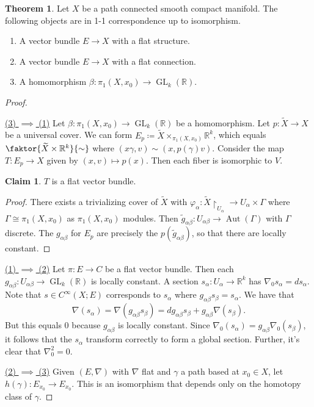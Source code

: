 \documentclass[10pt,letterpaper,cm]{nupset}
\theoremstyle{definition}
\theoremstyle{theorem}
\newtheorem{theorem}[definition]{Theorem}
\newtheorem*{claim}{Claim}
\theoremstyle{remark}
\newcommand{\R}{\mathbb{R}}
\newcommand{\1}{\mathbb{1}}
\newcommand{\0}{\vec 0}
\DeclareMathOperator{\GL}{GL}
\DeclareMathOperator{\aut}{Aut}
\begin{document}
\begin{theorem}
Let $X$ be a path connected smooth compact manifold. The following objects are in 1-1 correspondence up to isomorphism.
\begin{enumerate}[label=(\arabic*)]
\item A vector bundle $E \to X$ with a flat structure.
\item A vector bundle $E \to X$ with a flat connection.
\item A homomorphism $\beta : \pi_1\left(X, x_0\right) \to \GL_k(\R)$.
\end{enumerate}
\end{theorem}
\begin{proof} $ $
\smallskip

\underline{(3) $\implies$ (1)} Let $\beta : \pi_1\left(X, x_0\right) \to \GL_k(\R)$ be a homomorphism. Let $p : \widetilde{X} \to X$ be a universal cover. We can form $E_p \coloneqq  \widetilde{X} \times_{\pi_1\left(X, x_0\right)} \R^k$, which equals $\faktor{\widetilde{X} \times \R^k}{\sim}$ where $(x{\gamma}, v) \sim (x, p(\gamma)v)$.  Consider the map $T: E_p \to X$ given by $(x,v) \mapsto p(x)$. Then each fiber is isomorphic to $V$.
\begin{claim}
$T$ is a flat vector bundle.
\end{claim}
\begin{proof}
There exists a trivializing cover of $\widetilde{X}$ with $\varphi_{\alpha} : \widetilde{X}\restriction_{U_{\alpha}} \to U_{\alpha} \times \Gamma$ where $\Gamma \cong \pi_1\left(X, x_0\right)$ as $\pi_1\left(X, x_0\right)$ modules. Then $\tilde{g}_{\alpha{\beta}} : U_{\alpha{\beta}} \to \aut(\Gamma)$ with $\Gamma$ discrete. The $g_{\alpha{\beta}}$ for $E_p$ are precisely the $p(\tilde{g}_{\alpha{\beta}})$, so that there are locally constant. 
\end{proof}
\underline{(1) $\implies$ (2)} Let $\pi : E \to C$ be a flat vector bundle. Then each $g_{\alpha{\beta}} : U_{\alpha{\beta}} \to \GL_k(\R)$  is locally constant. A section  $s_{\alpha} : U_{\alpha} \to \R^k$ has $\nabla_0{s_{\alpha}} = ds_{\alpha}$. Note that $s \in C^{\infty}(X; E)$ corresponds to $s_{\alpha}$ where $g_{\alpha{\beta}}s_{\beta} = s_{\alpha}$. We have that $$ \nabla(s_{\alpha}) = \nabla(g_{\alpha{\beta}}s_{\beta}) = dg_{\alpha{\beta}} s_{\beta} + g_{\alpha{\beta}}\nabla(s_{\beta})    .$$ But this equals $0$ because $g_{\alpha{\beta}}$ is locally constant. Since $\nabla_0(s_{\alpha}) = g_{\alpha{\beta}} \nabla_0(s_{\beta})$, it follows that the $s_{\alpha}$  transform correctly to form a global section. Further, it's clear that $\nabla_0^2 =0$. 

\underline{(2) $\implies$ (3)} Given $(E, \nabla)$ with $\nabla$ flat and $\gamma$ a path based at $x_0 \in X$, let $h(\gamma) : E_{x_0} \to E_{x_0}$. This is an isomorphism that depends only on the homotopy class of $\gamma$.
\end{proof}
\end{document}
